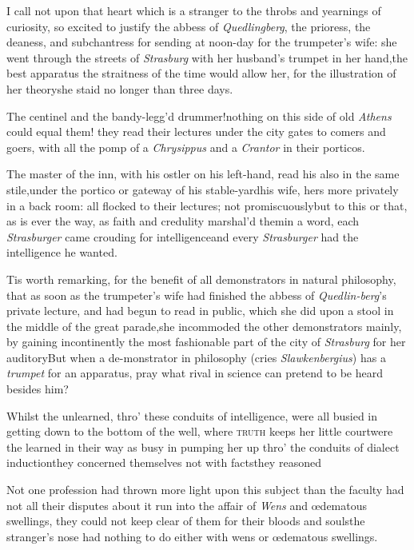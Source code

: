 \documentclass{article}
\begin{document}
I call not upon that heart which is a stranger to the throbs and
yearnings of curiosity, so excited to justify the abbess of
\textit{Quedlingberg}, the prioress, the deaness, and subchantress
for sending at noon-day for the trumpeter’s wife: she went
through the streets of \textit{Strasburg} with her husband’s
trumpet in her hand,\tsk the best apparatus the straitness
of the time would allow her, for the illustration of her theory\tsk she staid no longer than
three days.

The centinel and the bandy-legg’d\break
drummer!\tsh nothing on this side of old \textit{Athens}
could equal them! they read their lectures under the city gates to
comers and goers, with all the pomp of a \textit{Chrysippus} and a
\textit{Crantor} in their porticos.

The master of the inn, with his ostler on his left-hand, read
his also in the same stile,\tsk under the portico or gateway of
his stable-yard\tsk his wife, hers more privately in a back room:
all flocked to their lectures; not promiscuously\tsk but to this
or that, as is ever the way, as faith and credulity marshal’d
them\tsk in a word, each \textit{Strasburger} came crouding
for intelligence\tsk and every \textit{Strasburger} had the
intelligence he wanted.

Tis worth remarking, for the benefit of all demonstrators
in natural philosophy, \etc that as soon as the
trumpeter’s wife had finished the abbess of
\textit{Quedlin-berg}’s private lecture, and had begun to read
in public, which she did upon a stool in the middle of the great
parade,\tsh she incommoded the other demonstrators
mainly, by gaining incontinently the most fashionable part of the
city of \textit{Strasburg} for her auditory\tsk But when a
de-\break monstrator in philosophy (cries \textit{Slawken\-bergius}) has a
\textit{trumpet} for an apparatus, pray what rival in science can
pretend to be heard besides him?

Whilst the unlearned, thro’ these conduits of
intelligence, were all busied in getting down to the bottom of the
well, where \textsc{truth} keeps her little
court\tsh were the learned in their way as busy in pumping
her up thro’ the conduits of dialect
induction\tsk they concerned themselves not with
facts\tsk they reasoned\tsk

Not one profession had thrown more light upon this subject than
the faculty\tsk{} had not all their disputes about it run into the
affair of \textit{Wens} and œdematous swellings, they could not
keep clear of them for their bloods and souls\tsh the
stranger’s nose had nothing to do either with wens or
œdematous swellings.
\end{document}
